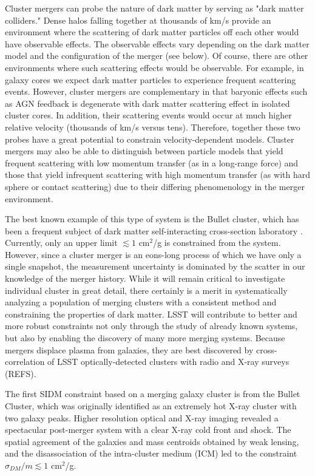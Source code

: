 Cluster mergers can probe the nature of dark matter by serving as "dark matter colliders." Dense halos falling together at thousands of km/s provide an environment where the scattering of dark matter particles off each other would have observable effects.  The observable effects vary depending on the dark matter model and the configuration of the merger (see below).  Of course, there are other environments where such scattering effects would be observable. For example, in galaxy cores we expect dark matter particles to experience frequent scattering events. However, cluster mergers are complementary in that baryonic effects such as AGN feedback is degenerate with dark matter scattering effect in isolated cluster cores. In addition, their scattering events would occur at much higher relative velocity (thousands of km/s versus tens). Therefore, together these two probes have a great potential to constrain velocity-dependent models.  Cluster mergers may also be able to distinguish between particle models that yield frequent scattering with low momentum transfer (as in a long-range force) and those that yield infrequent scattering with high momentum transfer (as with hard sphere or contact scattering) due to their differing phenomenology in the merger environment.

The best known example of this type of system is the Bullet cluster, which has been a frequent subject of dark matter self-interacting cross-section laboratory \citep{2008ApJ...679.1173R,2017MNRAS.465..569R}. Currently, only an upper limit  $\lesssim 1$ cm$^2$/g is constrained from the system.
However, since a cluster merger is an eons-long process of which we have only a single snapshot, the measurement uncertainty is dominated by the scatter in our knowledge of the merger history. While it will remain critical to investigate individual cluster in great detail, there certainly is a merit in systematically analyzing a population of merging clusters with a consistent method and constraining the properties of dark matter.
LSST will contribute to better and more robust constraints not only through the study of already known systems, but also by enabling the discovery of many more merging systems. Because mergers displace plasma from galaxies, they are best discovered by cross-correlation of  LSST optically-detected clusters with radio and X-ray surveys (REFS).


The first SIDM constraint based on a merging galaxy cluster is from the Bullet Cluster, which was originally identified as an extremely hot X-ray cluster with two galaxy peaks. Higher resolution optical and X-ray imaging revealed a spectacular post-merger system with a clear X-ray cold front and shock. The spatial agreement of the galaxies and mass centroids obtained by weak lensing, and the disassociation of the intra-cluster medium (ICM) led to the constraint $\sigma_{DM}/m \lesssim 1$ cm$^2$/g. 

